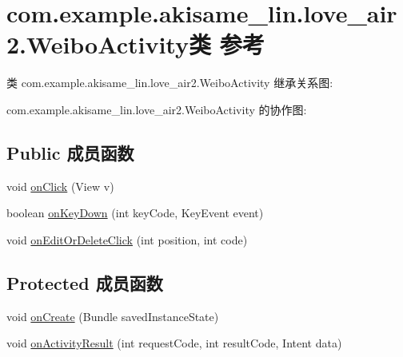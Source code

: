 \hypertarget{classcom_1_1example_1_1akisame__lin_1_1love__air2_1_1_weibo_activity}{}\section{com.\+example.\+akisame\+\_\+lin.\+love\+\_\+air2.\+Weibo\+Activity类 参考}
\label{classcom_1_1example_1_1akisame__lin_1_1love__air2_1_1_weibo_activity}


类 com.\+example.\+akisame\+\_\+lin.\+love\+\_\+air2.\+Weibo\+Activity 继承关系图\+:


com.\+example.\+akisame\+\_\+lin.\+love\+\_\+air2.\+Weibo\+Activity 的协作图\+:
\subsection*{Public 成员函数}
\begin{DoxyCompactItemize}
\item 
void \mbox{\hyperlink{classcom_1_1example_1_1akisame__lin_1_1love__air2_1_1_weibo_activity_adef0c1f320c30f69161597458fd0a5ef}{on\+Click}} (View v)
\item 
boolean \mbox{\hyperlink{classcom_1_1example_1_1akisame__lin_1_1love__air2_1_1_weibo_activity_aae5a6afe5e8127737633afb51389d7ed}{on\+Key\+Down}} (int key\+Code, Key\+Event event)
\item 
void \mbox{\hyperlink{classcom_1_1example_1_1akisame__lin_1_1love__air2_1_1_weibo_activity_aedbe554dbde01c133839bb1a274faaca}{on\+Edit\+Or\+Delete\+Click}} (int position, int code)
\end{DoxyCompactItemize}
\subsection*{Protected 成员函数}
\begin{DoxyCompactItemize}
\item 
void \mbox{\hyperlink{classcom_1_1example_1_1akisame__lin_1_1love__air2_1_1_weibo_activity_a19573fc5855613eb34ad13ce3b18d069}{on\+Create}} (Bundle saved\+Instance\+State)
\item 
void \mbox{\hyperlink{classcom_1_1example_1_1akisame__lin_1_1love__air2_1_1_weibo_activity_ae70d94f79c394a1606101771d931a927}{on\+Activity\+Result}} (int request\+Code, int result\+Code, Intent data)
\end{DoxyCompactItemize}
